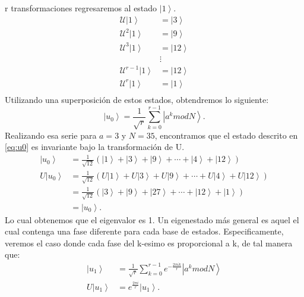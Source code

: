 r transformaciones regresaremos al estado $\left|1\right\rangle$.
\begin{align*}
    \mathcal{U}\left| 1 \right\rangle &= \left|3\right\rangle \\
    \mathcal{U}^2\left| 1 \right\rangle &= \left|9\right\rangle \\
    \mathcal{U}^3\left| 1 \right\rangle &= \left|12\right\rangle \\ 
                   & \vdots  \\ 
    \mathcal{U}^{r-1}\left| 1 \right\rangle &= \left|12\right\rangle \\
    \mathcal{U}^r\left| 1 \right\rangle &= \left|1\right\rangle \\
\end{align*}
Utilizando una superposición de estos estados, obtendremos lo siguiente:
\begin{equation}
    \left| u_0 \right\rangle = \frac{1}{\sqrt{r}} \sum\limits_{k=0}^{r-1} \left|a^k mod N \right\rangle.
    \label{eq:u0}
\end{equation}
Realizando esa serie para $a=3$ y $N=35$, encontramos que el estado descrito en \ref{eq:u0} es invariante bajo la transformación de U.
\begin{align*}
    \left| u_0 \right\rangle &= \frac{1}{\sqrt{12}} \left(\left|1\right\rangle + \left|3\right\rangle+ \left|9\right\rangle 
    +\cdots +\left|4\right\rangle + \left|12\right\rangle \right)\\
    U\left| u_0 \right\rangle &= \frac{1}{\sqrt{12}} \left(U\left|1\right\rangle + U\left|3\right\rangle+ U\left|9\right\rangle 
    +\cdots +U\left|4\right\rangle + U\left|12\right\rangle \right)\\
    &= \frac{1}{\sqrt{12}} \left(\left|3\right\rangle + \left|9\right\rangle+ \left|27\right\rangle 
    +\cdots +\left|12\right\rangle + \left|1\right\rangle \right)\\
    &= \left| u_0 \right\rangle .
\end{align*}
Lo cual obtenemos que el eigenvalor es 1. Un eigenestado más general es aquel el cual contenga una fase diferente para cada base de estados. Especificamente, veremos el caso
donde cada fase del k-esimo es proporcional a k, de tal manera que:
\begin{align}
    \label{eq:u1}
    \left| u_1 \right\rangle &= \frac{1}{\sqrt{r}} \sum\limits_{k=0}^{r-1} e^{-\frac{2\pi i k}{r}} \left| a^k mod N \right\rangle \\
    \label{eq:ua1}
    U\left| u_1 \right\rangle &= e^{\frac{2\pi i}{r}} \left| u_1 \right\rangle.
\end{align}
